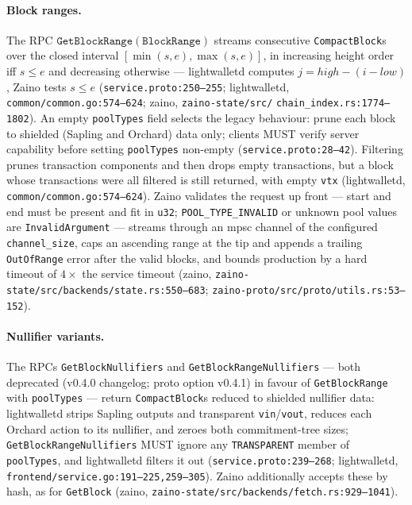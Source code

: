 \documentclass[11pt,a4paper]{article}
\theoremstyle{definition}
\begin{document}
\paragraph{Block ranges.} The RPC
$\mathtt{GetBlockRange}(\mathtt{BlockRange})$ streams consecutive
\texttt{CompactBlock}s over the closed interval
$[\min(s,e), \max(s,e)]$, in increasing height order iff $s \le e$ and
decreasing otherwise --- lightwalletd computes
$j = \mathit{high} - (i - \mathit{low})$, Zaino tests
$s \le e$ (\texttt{service.proto:250--255};
\textsf{lightwalletd}, \texttt{common/common.go:574--624};
\textsf{zaino}, \texttt{zaino-state/}\allowbreak\texttt{src/}\allowbreak
\texttt{chain\_index.rs:1774--1802}). An
empty \texttt{poolTypes} field selects the legacy behaviour: prune each
block to shielded (Sapling and Orchard) data only; clients MUST verify
server capability before setting \texttt{poolTypes} non-empty
(\texttt{service.proto:28--42}). Filtering prunes transaction components
and then drops empty transactions, but a block whose transactions were all
filtered is still returned, with empty \texttt{vtx}
(\textsf{lightwalletd}, \texttt{common/common.go:574--624}). Zaino
validates the request up front --- start and end must be present and fit
in \texttt{u32}; \texttt{POOL\_TYPE\_INVALID} or unknown pool values are
\texttt{InvalidArgument} --- streams through an mpsc channel of the
configured \texttt{channel\_size}, caps an ascending range at the tip and
appends a trailing \texttt{OutOfRange} error after the valid blocks, and
bounds production by a hard timeout of $4 \times$ the service timeout
(\textsf{zaino}, \texttt{zaino-state/src/backends/state.rs:550--683};
\texttt{zaino-proto/src/proto/utils.rs:53--152}).

\paragraph{Nullifier variants.} The RPCs \texttt{GetBlockNullifiers}
and \texttt{GetBlockRangeNullifiers} ---
both deprecated (v0.4.0 changelog; proto option v0.4.1) in favour of
\texttt{GetBlockRange} with
\texttt{poolTypes} --- return \texttt{CompactBlock}s reduced to shielded
nullifier data: lightwalletd strips Sapling outputs and transparent
\texttt{vin}/\texttt{vout}, reduces each Orchard action to its nullifier,
and zeroes both commitment-tree sizes; \texttt{GetBlockRangeNullifiers}
MUST ignore any \texttt{TRANSPARENT} member of \texttt{poolTypes}, and
lightwalletd filters it out (\texttt{service.proto:239--268};
\textsf{lightwalletd}, \texttt{frontend/service.go:191--225,259--305}).
Zaino additionally accepts these by hash, as for \texttt{GetBlock}
(\textsf{zaino}, \texttt{zaino-state/src/backends/fetch.rs:929--1041}).
\end{document}
